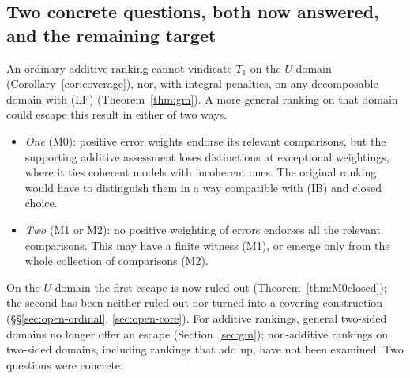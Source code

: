 \documentclass[11pt]{article}
\theoremstyle{definition}
\theoremstyle{remark}
\begin{document}
\subsection{Two concrete questions, both now answered, and the remaining target}\label{sec:two-questions}
An ordinary additive ranking cannot vindicate $T_1$ on the $U$-domain (Corollary~\ref{cor:coverage}), nor, with integral penalties, on any decomposable domain with (LF) (Theorem~\ref{thm:gm}). A more general ranking on that domain could escape this result in either of two ways.
\begin{itemize}[leftmargin=*]
\item \emph{One} (M0): positive error weights endorse its relevant comparisons, but the supporting additive assessment loses distinctions at exceptional weightings, where it ties coherent models with incoherent ones. The original ranking would have to distinguish them in a way compatible with (IB) and closed choice.
\item \emph{Two} (M1 or M2): no positive weighting of errors endorses all the relevant comparisons. This may have a finite witness (M1), or emerge only from the whole collection of comparisons (M2).
\end{itemize}
On the $U$-domain the first escape is now ruled out (Theorem~\ref{thm:M0closed}); the second has been neither ruled out nor turned into a covering construction (\S\S\ref{sec:open-ordinal}, \ref{sec:open-core}). For additive rankings, general two-sided domains no longer offer an escape (Section~\ref{sec:gm}); non-additive rankings on two-sided domains, including rankings that add up, have not been examined. Two questions were concrete:
\end{document}
